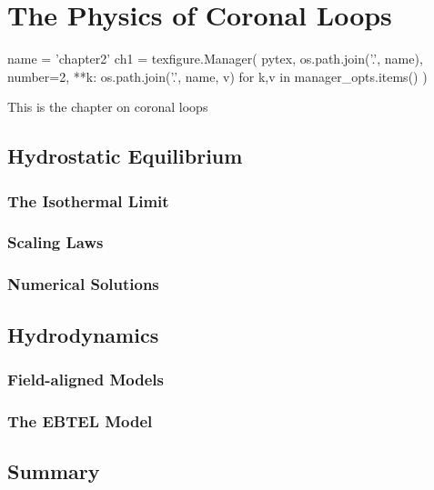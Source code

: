 \chapter{The Physics of Coronal Loops}\label{ch:loops}

\begin{pycode}[chapter2]
name = 'chapter2'
ch1 = texfigure.Manager(
    pytex,
    os.path.join('.', name),
    number=2,
    **{k: os.path.join('.', name, v) for k,v in manager_opts.items()}
)
\end{pycode}

This is the chapter on coronal loops

\section{Hydrostatic Equilibrium}



\subsection{The Isothermal Limit}

\subsection{Scaling Laws}\label{sec:scaling_laws}


\subsection{Numerical Solutions}


\section{Hydrodynamics}


\subsection{Field-aligned Models}


\subsection{The EBTEL Model}\label{sec:ebtel}


\section{Summary}
